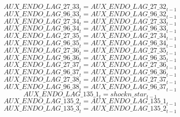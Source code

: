 \begin{dmath}
{AUX\_ENDO\_LAG\_27\_33}_{t}={AUX\_ENDO\_LAG\_27\_32}_{t-1}
\end{dmath}
\begin{dmath}
{AUX\_ENDO\_LAG\_96\_33}_{t}={AUX\_ENDO\_LAG\_96\_32}_{t-1}
\end{dmath}
\begin{dmath}
{AUX\_ENDO\_LAG\_27\_34}_{t}={AUX\_ENDO\_LAG\_27\_33}_{t-1}
\end{dmath}
\begin{dmath}
{AUX\_ENDO\_LAG\_96\_34}_{t}={AUX\_ENDO\_LAG\_96\_33}_{t-1}
\end{dmath}
\begin{dmath}
{AUX\_ENDO\_LAG\_27\_35}_{t}={AUX\_ENDO\_LAG\_27\_34}_{t-1}
\end{dmath}
\begin{dmath}
{AUX\_ENDO\_LAG\_96\_35}_{t}={AUX\_ENDO\_LAG\_96\_34}_{t-1}
\end{dmath}
\begin{dmath}
{AUX\_ENDO\_LAG\_27\_36}_{t}={AUX\_ENDO\_LAG\_27\_35}_{t-1}
\end{dmath}
\begin{dmath}
{AUX\_ENDO\_LAG\_96\_36}_{t}={AUX\_ENDO\_LAG\_96\_35}_{t-1}
\end{dmath}
\begin{dmath}
{AUX\_ENDO\_LAG\_27\_37}_{t}={AUX\_ENDO\_LAG\_27\_36}_{t-1}
\end{dmath}
\begin{dmath}
{AUX\_ENDO\_LAG\_96\_37}_{t}={AUX\_ENDO\_LAG\_96\_36}_{t-1}
\end{dmath}
\begin{dmath}
{AUX\_ENDO\_LAG\_27\_38}_{t}={AUX\_ENDO\_LAG\_27\_37}_{t-1}
\end{dmath}
\begin{dmath}
{AUX\_ENDO\_LAG\_96\_38}_{t}={AUX\_ENDO\_LAG\_96\_37}_{t-1}
\end{dmath}
\begin{dmath}
{AUX\_ENDO\_LAG\_135\_1}_{t}={shockn\_star}_{t-1}
\end{dmath}
\begin{dmath}
{AUX\_ENDO\_LAG\_135\_2}_{t}={AUX\_ENDO\_LAG\_135\_1}_{t-1}
\end{dmath}
\begin{dmath}
{AUX\_ENDO\_LAG\_135\_3}_{t}={AUX\_ENDO\_LAG\_135\_2}_{t-1}
\end{dmath}
